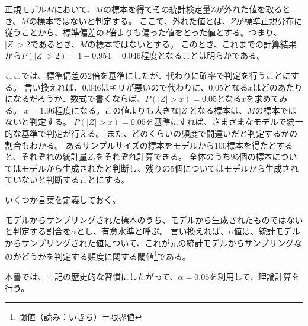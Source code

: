 正規モデル$M$において、$M$の標本を得てその統計検定量Zが外れた値を取るとき、$M$の標本ではないと判定する。
ここで、外れた値とは、$Z$が標準正規分布に従うことから、標準偏差の2倍よりも偏った値をとった値とする。つまり、$|Z|>2$であるとき、$M$の標本ではないとする。
このとき、これまでの計算結果から$P(|Z|>2)=1-0.954=0.046$程度となることは明らかである。

ここでは、標準偏差の2倍を基準にしたが、代わりに確率で判定を行うことにする。
言い換えれば、$0.046$はキリが悪いので代わりに、$0.05$となる$x$はどのあたりになるだろうか、数式で書くならば、$P(|Z|>x)=0.05$となる$x$を求めてみる。
$x=1.96$程度になる。この値よりも大きな$|Z|$となる標本は、$M$の標本ではないと判定する。
$P(|Z|>x)=0.05$を基準にすれば、さまざまなモデルで統一的な基準で判定が行える。
また、どのくらいの頻度で間違いだと判定するかの割合もわかる。
あるサンプルサイズの標本をモデルから$100$標本を得たとすると、それぞれの統計量$Z_i$をそれぞれ計算できる。
全体のうち$95$個の標本についてはモデルから生成されたと判断し、残りの5個についてはモデルから生成されていないと判断することにする。


いくつか言葉を定義しておく。
\begin{defi}
    モデルからサンプリングされた標本のうち、モデルから生成されたものではないと判定する割合を$\alpha$とし、有意水準と呼ぶ。
    言い換えれば、$\alpha$値は、統計モデルからサンプリングされた値について、これが元の統計モデルからサンプリングなのかどうかを判定する頻度に関する閾値\footnote{閾値（読み：いきち）＝限界値}である。
\end{defi}

本書では、上記の歴史的な習慣にしたがって、$\alpha=0.05$を利用して、理論計算を行う。





\fi


